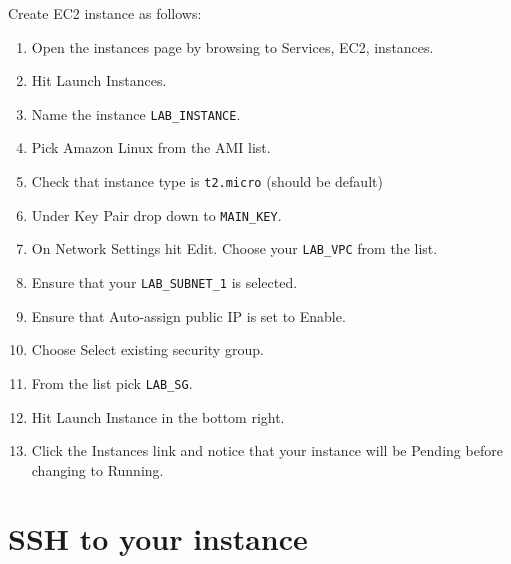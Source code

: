 Create EC2 instance as follows:
\begin{enumerate}
\item Open the instances page by browsing to Services, EC2, instances.

\item Hit Launch Instances.

\item Name the instance \texttt{LAB\_INSTANCE}.

\item Pick Amazon Linux from the AMI list.

\item Check that instance type is \texttt{t2.micro} (should be default)

\item Under Key Pair drop down to \texttt{MAIN\_KEY}.

\item On Network Settings hit Edit. Choose your \texttt{LAB\_VPC} from the list.

\item Ensure that your \texttt{LAB\_SUBNET\_1} is selected.

\item Ensure that Auto-assign public IP is set to Enable.
  
\item Choose Select existing security group.

\item From the list pick \texttt{LAB\_SG}.

\item Hit Launch Instance in the bottom right.

\item Click the Instances link and notice that your instance will be Pending before changing to Running.
  
\end{enumerate}

\section{SSH to your instance}

